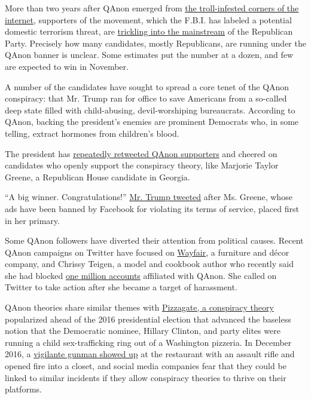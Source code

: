 More than two years after QAnon emerged from
\href{https://www.nytimes.com/2018/08/01/us/politics/what-is-qanon.html}{the
troll-infested corners of the internet}, supporters of the movement,
which the F.B.I. has labeled a potential domestic terrorism threat, are
\href{https://www.nytimes.com/2020/07/14/us/politics/qanon-politicians-candidates.html}{trickling
into the mainstream} of the Republican Party. Precisely how many
candidates, mostly Republicans, are running under the QAnon banner is
unclear. Some estimates put the number at a dozen, and few are expected
to win in November.

A number of the candidates have sought to spread a core tenet of the
QAnon conspiracy: that Mr. Trump ran for office to save Americans from a
so-called deep state filled with child-abusing, devil-worshiping
bureaucrats. According to QAnon, backing the president's enemies are
prominent Democrats who, in some telling, extract hormones from
children's blood.

The president has
\href{https://www.politico.com/news/2020/07/12/trump-tweeting-qanon-followers-357238}{repeatedly
retweeted QAnon supporters} and cheered on candidates who openly support
the conspiracy theory, like Marjorie Taylor Greene, a Republican House
candidate in Georgia.

``A big winner. Congratulations!''
\href{https://twitter.com/realDonaldTrump/status/1271428819296157697?s=20}{Mr.
Trump tweeted} after Ms. Greene, whose ads have been banned by Facebook
for violating its terms of service, placed first in her primary.

Some QAnon followers have diverted their attention from political
causes. Recent QAnon campaigns on Twitter have focused on
\href{https://www.nytimes.com/aponline/2020/07/16/business/ap-us-wayfair-conspiracy-theory.html}{Wayfair},
a furniture and décor company, and Chrissy Teigen, a model and cookbook
author who recently said she had blocked
\href{https://www.elle.com/uk/life-and-culture/culture/a33333809/chrissy-teigen-conspiracy-theorist-drama-jeffrey-epstein/}{one
million accounts} affiliated with QAnon. She called on Twitter to take
action after she became a target of harassment.

QAnon theories share similar themes with
\href{https://www.nytimes.com/2016/11/21/technology/fact-check-this-pizzeria-is-not-a-child-trafficking-site.html?searchResultPosition=11}{Pizzagate,
a conspiracy theory} popularized ahead of the 2016 presidential election
that advanced the baseless notion that the Democratic nominee, Hillary
Clinton, and party elites were running a child sex-trafficking ring out
of a Washington pizzeria. In December 2016, a
\href{https://www.nytimes.com/2016/12/05/business/media/comet-ping-pong-pizza-shooting-fake-news-consequences.html?searchResultPosition=12}{vigilante
gunman showed up} at the restaurant with an assault rifle and opened
fire into a closet, and social media companies fear that they could be
linked to similar incidents if they allow conspiracy theories to thrive
on their platforms.

